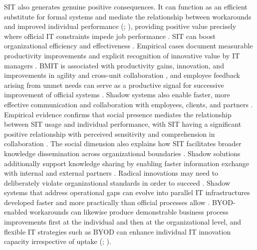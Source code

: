 \documentclass[12pt,oneside]{article}
\begin{document}
\ac{SIT} also generates genuine positive consequences. It can function as an efficient substitute for formal systems and mediate the relationship between workarounds and improved individual performance (\citealp[242]{pinto2023encourage}; \citealp[1025]{silic2017perspective}), providing positive value precisely where official \ac{IT} constraints impede job performance \citep[739]{haag2019acceptance}. \ac{SIT} can boost organizational efficiency and effectiveness \citep[1171]{trialih2023challenge}. Empirical cases document measurable productivity improvements and explicit recognition of innovative value by \ac{IT} managers \citep[8]{kopper2018business}. \ac{BMIT} is associated with productivity gains, innovation, and improvements in agility and cross-unit collaboration \citep[4]{godefroid2021it}, and employee feedback arising from unmet needs can serve as a productive signal for successive improvement of official systems \citep[653]{walterbusch2017missing}. Shadow systems also enable faster, more effective communication and collaboration with employees, clients, and partners \citep[26]{mallmann2018influence}. Empirical evidence confirms that social presence mediates the relationship between \ac{SIT} usage and individual performance, with \ac{SIT} having a significant positive relationship with perceived sensitivity and comprehension in collaboration \citep[427]{mallmann2021mediating}. The social dimension also explains how \ac{SIT} facilitates broader knowledge dissemination across organizational boundaries \citep[6468]{mallmann2019social}. Shadow solutions additionally support knowledge sharing by enabling faster information exchange with internal and external partners \citep[2]{klotz2019transformed}. Radical innovations may need to deliberately violate organizational standards in order to succeed \citep[1]{roeder2014managers}. Shadow systems that address operational gaps can evolve into parallel \ac{IT} infrastructures developed faster and more practically than official processes allow \citep[3]{keskin2021domesticating}. \ac{BYOD}-enabled workarounds can likewise produce demonstrable business process improvements first at the individual and then at the organizational level, and flexible \ac{IT} strategies such as \ac{BYOD} can enhance individual \ac{IT} innovation capacity irrespective of uptake (\citealp[2]{dulipovici2016byod}; \citealp[373]{koeffer2015innovation}).
\end{document}
